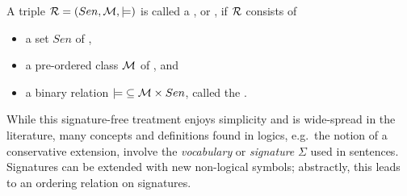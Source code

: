 \documentclass[%
\ifpretendfinal
final%
\else
draft%
\fi,
a4paper,
wd]{isov2}
\newcommand*{\syntax}[1]{\texttt{#1}}
\begin{document}
\begin{definition}\label{def:room}
A triple $\cR=(Sen,{\cM,\models)}$  is called a  , or , if $\cR$  consists of
\begin{itemize}
\item a set $Sen$ of ,
\item a pre-ordered class
$\cM$ of , and
\item a binary relation
${\models}\subseteq \cM \times Sen$, called the .
\end{itemize}
\end{definition}


While this signature-free treatment enjoys simplicity and is
wide-spread in the literature, many concepts and definitions found in
logics, e.g.\ the notion of a conservative extension, involve the
\emph{vocabulary} or \emph{signature} $\Sigma$ \label{vocabulary} used
in sentences.  Signatures can be extended with new non-logical symbols;
abstractly, this leads to an ordering relation on signatures.
\end{document}
